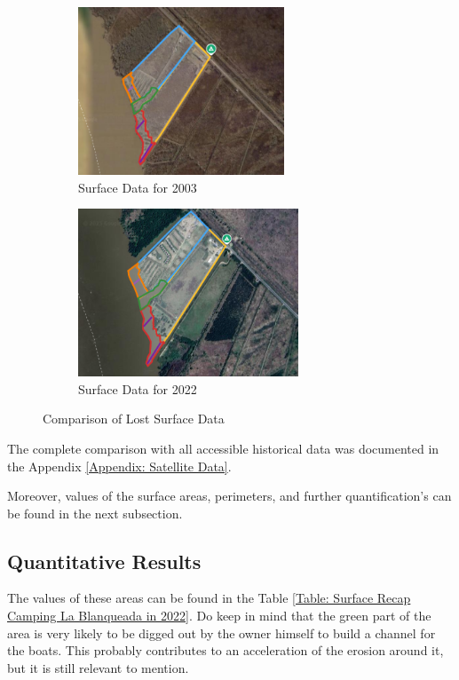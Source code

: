 \begin{figure}[H]
    \centering
    \begin{subfigure}[b]{0.45\textwidth} %
        \includegraphics[width=\linewidth, height=5cm]{figures/appendix-g/delen2003.png}
        \caption{Surface Data for 2003}
        \label{fig:surface2003.1}
    \end{subfigure}
    \hfill
    \begin{subfigure}[b]{0.45\textwidth} %
        \includegraphics[width=\linewidth, height=5cm]{figures/appendix-g/delen2022.png}
        \caption{Surface Data for 2022}
        \label{fig:surface2022.1}
    \end{subfigure}
    \caption{Comparison of Lost Surface Data}
    \label{fig:surfacelost_comparison}
\end{figure}


The complete comparison with all accessible historical data was documented in the Appendix \ref{Appendix: Satellite Data}.

Moreover, values of the surface areas, perimeters, and further quantification's can be found in the next subsection.

\subsection{Quantitative Results}

The values of these areas can be found in the Table \ref{Table: Surface Recap Camping La Blanqueada in 2022}.
Do keep in mind that the green part of the area is very likely to be digged out by the owner himself to build a channel for the boats. This probably contributes to an acceleration of the erosion around it, but it is still relevant to mention.

